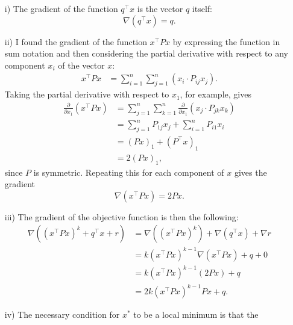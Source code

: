 \begin{homeworkProblem}
    \begin{solution}
        \begin{itemize}
            \item[i)] The gradient of the function $q^\top x$ is the vector $q$ itself:
                \[
                    \nabla (q^\top x) = q.
                \]
            \item[ii)] I found the gradient of the function $x^\top P x$ by expressing the 
                function in sum notation and then considering the partial derivative 
                with respect to any component $x_i$ of the vector $x$:
                \begin{align*}
                    x^\top P x &= \sum_{i=1}^n \sum_{j=1}^n \left( x_i \cdot P_{ij} x_j 
                    \right).
                \end{align*}
                Taking the partial derivative with respect to $x_1$, for example, gives
                \begin{align*}
                    \frac{\partial}{\partial x_1} (x^\top P x)
                    &= \sum_{j=1}^n \sum_{k=1}^n \frac{\partial}{\partial x_1} (x_j \cdot 
                    P_{jk} x_k) \\
                    &= \sum_{j=1}^n P_{1j} x_j + \sum_{i=1}^n P_{i1} x_i \\
                    &= (P x)_1 + (P^\top x)_1 \\
                    &= 2 (P x)_1,
                \end{align*}
                since $P$ is symmetric. Repeating this for each component of $x$ gives 
                the gradient
                \[
                    \nabla (x^\top P x) = 2 P x.
                \]
            \item[iii)] The gradient of the objective function is then the following:
                \begin{align*}
                    \nabla \left( (x^\top P x)^k + q^\top x + r \right)
                    &= \nabla \left( (x^\top P x)^k \right) + \nabla (q^\top x) + 
                    \nabla r \\
                    &= k (x^\top P x)^{k-1} \nabla (x^\top P x) + q + 0 \\
                    &= k (x^\top P x)^{k-1} (2 P x) + q \\
                    &= 2 k (x^\top P x)^{k-1} P x + q.
                \end{align*}
            \item[iv)] The necessary condition for $x^*$ to be a local minimum is that the 

\end{itemize}
\end{solution}
\end{homeworkProblem}
